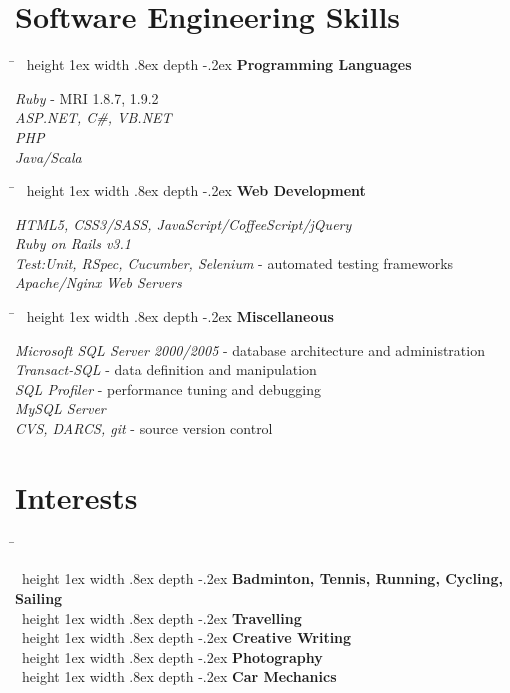 \documentclass[10pt]{article} %
\newlength{\smallertextwidth}
\newcommand{\sqbullet}{~\vrule height 1ex width .8ex depth -.2ex} %
\newcommand{\skillgroup}[2]{
\begin{tabbing}
\hspace{5mm} \= \kill
\sqbullet \>\+ \textbf{#1}\\
\begin{minipage}{\smallertextwidth}
\vspace{2mm}
#2
\end{minipage}
\end{tabbing}
}
\newcommand{\interestsgroup}[1]{
\begin{tabbing}
\hspace{5mm} \= \kill
#1
\end{tabbing}
\vspace{-10mm}
}
\newcommand{\interest}[1]{\sqbullet \> \textbf{#1}\\[3pt]}
\begin{document}

\section{Software Engineering Skills}

\skillgroup{Programming Languages}
{
\textit{Ruby} - MRI 1.8.7, 1.9.2\\
\textit{ASP.NET, C\#, VB.NET}\\
\textit{PHP}\\
\textit{Java/Scala}
}


\skillgroup{Web Development}
{
\textit{HTML5, CSS3/SASS, JavaScript/CoffeeScript/jQuery}\\
\textit{Ruby on Rails v3.1}\\
\textit{Test:Unit, RSpec, Cucumber, Selenium} - automated testing frameworks\\
\textit{Apache/Nginx Web Servers}\\
}


\skillgroup{Miscellaneous}
{
\textit{Microsoft SQL Server 2000/2005} - database architecture and administration\\
\textit{Transact-SQL} - data definition and manipulation\\
\textit{SQL Profiler} - performance tuning and debugging\\
\textit{MySQL Server}\\
\textit{CVS, DARCS, git} - source version control
}


\section{Interests}

\interestsgroup{
\interest{Badminton, Tennis, Running, Cycling, Sailing}
\interest{Travelling}
\interest{Creative Writing}
\interest{Photography}
\interest{Car Mechanics}
}

\end{document}
